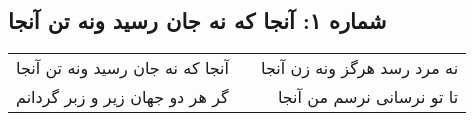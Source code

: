 \begin{center}
\section*{شماره ۱: آنجا که نه جان رسید ونه تن آنجا}
\label{sec:001}
\begin{longtable}{l p{0.5cm} r}
آنجا که نه جان رسید ونه تن آنجا
&&
نه مرد رسد هرگز ونه زن آنجا
\\
گر هر دو جهان زیر و زبر گردانم
&&
تا تو نرسانی نرسم من آنجا
\\
\end{longtable}
\end{center}
